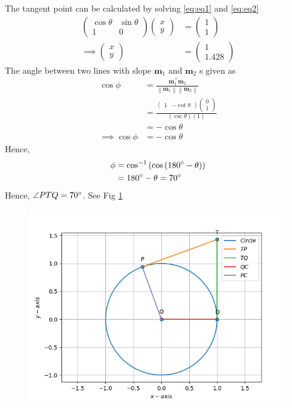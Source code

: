 \documentclass[12pt]{article}
\providecommand{\brak}[1]{\ensuremath{\left(#1\right)}}
\providecommand{\norm}[1]{\left\lVert#1\right\rVert}
\newcommand{\myvec}[1]{\ensuremath{\begin{pmatrix}#1\end{pmatrix}}}
\let\vec\mathbf
\begin{document}
The tangent point can be calculated by solving \eqref{eq:eq1} and \eqref{eq:eq2}
\begin{align}
	\myvec{\cos\theta&\sin\theta\\1&0}\myvec{x\\y} &= \myvec{1\\1}\\
	\implies \myvec{x\\y} &= \myvec{1\\1.428}
\end{align}
The angle between two lines with slope $\vec{m}_1 \text{ and } \vec{m}_2$ s given as
\begin{align}
	\cos\phi &= \frac{\vec{m}_1^\top\vec{m}_2}{\norm{\vec{m}_1}\norm{\vec{m}_2}}\\
	&= \frac{\myvec{1&-\cot\theta}\myvec{0\\1}}{\brak{\csc\theta}\brak{1}}\\
	&= -\cos\theta\\
	\implies \cos\phi &= -\cos\theta
\end{align}
Hence,
\begin{align}
	\phi &= \cos^{-1}\brak{\cos{\brak{180\degree-\theta}}}\\
	     &= 180\degree-\theta = 70\degree
\end{align}
Hence, $\angle{PTQ} = 70\degree$. See Fig \ref{fig:Fig1}
\begin{figure}[!h]
	\begin{center} 
	    \includegraphics[width=\columnwidth]{figs/tangent2}
	\end{center}
\caption{}
\label{fig:Fig1}
\end{figure}
\end{document}
